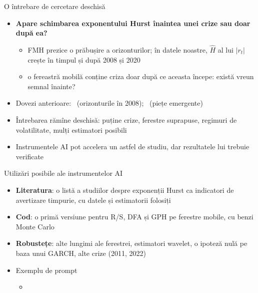\begin{frame}{O întrebare de cercetare deschisă}
\itemsize{\small}
\begin{itemize}
    \item \textbf{Apare schimbarea exponentului Hurst înaintea unei crize sau doar după ea?}
    \begin{itemize}
        \item FMH prezice o prăbușire a orizonturilor; în datele noastre, $\hat H$ al lui $|r_t|$ crește în timpul și după 2008 și 2020
        \item o fereastră mobilă conține criza doar după ce aceasta începe: există vreun semnal înainte?
    \end{itemize}
    \item Dovezi anterioare: \ (orizonturile în 2008); \ (piețe emergente)
    \item Întrebarea rămîne deschisă: puține crize, ferestre suprapuse, regimuri de volatilitate, mulți estimatori posibili
    \item Instrumentele AI pot accelera un astfel de studiu, dar rezultatele lui trebuie verificate 
\end{itemize}
\end{frame}

\begin{frame}{Utilizări posibile ale instrumentelor AI}
\itemsize{\small}
\begin{itemize}
    \item \textbf{Literatura}: o listă a studiilor despre exponenții Hurst ca indicatori de avertizare timpurie, cu datele și estimatorii folosiți
    \item \textbf{Cod}: o primă versiune pentru R/S, DFA și GPH pe ferestre mobile, cu benzi Monte Carlo
    \item \textbf{Robustețe}: alte lungimi ale ferestrei, estimatori wavelet, o ipoteză nulă pe baza unui GARCH, alte crize (2011, 2022)
    \item Exemplu de prompt
    \begin{itemize}
        \item {}
    \end{itemize}
\end{itemize}
\end{frame}

